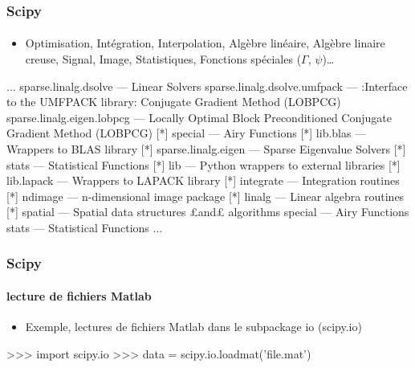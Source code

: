 \begin{frame}[fragile]
\frametitle{Scipy}
\framesubtitle{}
\begin{itemize}
 \item Optimisation, Intégration, Interpolation, Algèbre linéaire, Algèbre linaire creuse, Signal, Image, Statistiques, Fonctions spéciales ($\Gamma$, $\psi$)\dots
\end{itemize}
\begin{pythonConsole}
    ...
     sparse.linalg.dsolve         --- Linear Solvers
     sparse.linalg.dsolve.umfpack --- :Interface to the UMFPACK library:
                                      Conjugate Gradient Method (LOBPCG)
     sparse.linalg.eigen.lobpcg   --- Locally Optimal Block Preconditioned
                                      Conjugate Gradient Method (LOBPCG) [*]
     special                      --- Airy Functions [*]
     lib.blas                     --- Wrappers to BLAS library [*]
     sparse.linalg.eigen          --- Sparse Eigenvalue Solvers [*]
     stats                        --- Statistical Functions [*]
     lib                          --- Python wrappers to external libraries
                                      [*]
     lib.lapack                   --- Wrappers to LAPACK library [*]
     integrate                    --- Integration routines [*]
     ndimage                      --- n-dimensional image package [*]
     linalg                       --- Linear algebra routines [*]
     spatial                      --- Spatial data structures £and£ algorithms
     special                      --- Airy Functions
     stats                        --- Statistical Functions
    ...
\end{pythonConsole}
\end{frame}
\begin{frame}[fragile]
\frametitle{Scipy}
\framesubtitle{lecture de fichiers Matlab}
\begin{itemize}
 \item Exemple, lectures de fichiers Matlab dans le subpackage io (scipy.io)
\end{itemize}

\begin{pythonConsole}
>>> import scipy.io
>>> data = scipy.io.loadmat('file.mat')
\end{pythonConsole}
\end{frame}
